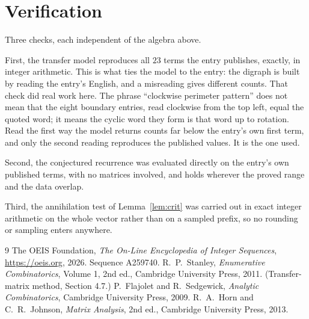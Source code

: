\documentclass[11pt,a4paper]{article}
\theoremstyle{plain}
\theoremstyle{definition}
\begin{document}
\section{Verification}

Three checks, each independent of the algebra above.

First, the transfer model reproduces all $23$ terms the entry publishes, exactly, in
integer arithmetic. This is what ties the model to the entry: the digraph is built by reading
the entry's English, and a misreading gives different counts. That check did real work here. The phrase ``clockwise perimeter pattern'' does not mean that the eight boundary entries, read clockwise from the top left, equal the quoted word; it means the cyclic word they form is that word up to rotation. Read the first way the model returns counts far below the entry's own first term, and only the second reading reproduces the published values. It is the one used.

Second, the conjectured recurrence was evaluated directly on the entry's own published terms,
with no matrices involved, and holds wherever the proved range and the data overlap.

Third, the annihilation test of Lemma~\ref{lem:crit} was carried out in exact integer
arithmetic on the whole vector rather than on a sampled prefix, so no rounding or sampling
enters anywhere.

\begin{thebibliography}{9}
 The OEIS Foundation, \emph{The On-Line Encyclopedia of Integer
Sequences}, \url{https://oeis.org}, 2026. Sequence A259740.
 R.~P.~Stanley, \emph{Enumerative Combinatorics}, Volume 1, 2nd ed.,
Cambridge University Press, 2011. (Transfer-matrix method, Section 4.7.)
 P.~Flajolet and R.~Sedgewick, \emph{Analytic Combinatorics}, Cambridge
University Press, 2009.
 R.~A.~Horn and C.~R.~Johnson, \emph{Matrix Analysis}, 2nd ed., Cambridge
University Press, 2013.
\end{thebibliography}
\end{document}
